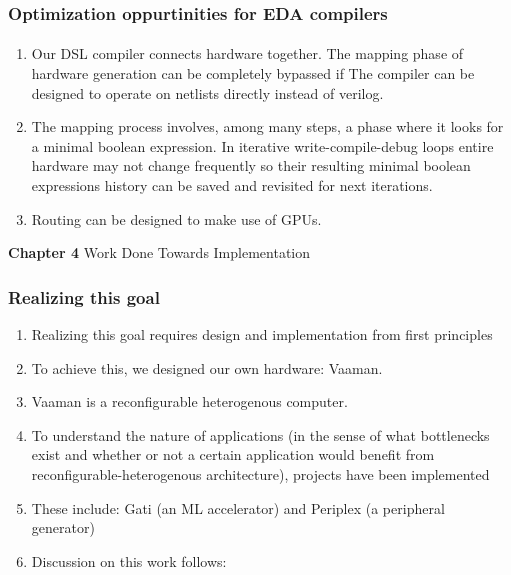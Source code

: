 \documentclass{beamer}
\begin{document}
{\begin{frame}[fragile]
  \frametitle{Optimization oppurtinities for EDA compilers}
  \framesubtitle{}
  \begin{enumerate}
    \item Our DSL compiler connects hardware together. The mapping phase
      of hardware generation can be completely bypassed if The compiler can
      be designed to operate on netlists directly instead of verilog.
    \item The mapping process involves, among many steps, a phase where it looks
      for a minimal boolean expression. In iterative write-compile-debug loops
      entire hardware may not change frequently so their resulting minimal
      boolean expressions history can be saved and revisited for next
      iterations.
    \item Routing can be designed to make use of GPUs.
  \end{enumerate}
\end{frame}

\begin{frame}[c,fragile]

  \centering
  \textbf{Chapter 4}
  Work Done Towards Implementation
\end{frame}

\begin{frame}[fragile]
  \frametitle{Realizing this goal}
  \begin{enumerate}
    \item Realizing this goal requires design and implementation from
      first principles
    \item To achieve this, we designed our own hardware: Vaaman. 
    \item Vaaman is a reconfigurable heterogenous computer.
    \item To understand the nature of applications (in the sense of what
      bottlenecks exist and whether or not a certain application would
      benefit from reconfigurable-heterogenous architecture), projects have been implemented
    \item These include: Gati (an ML accelerator) and Periplex (a peripheral
      generator)
    \item Discussion on this work follows:
  \end{enumerate}
  \framesubtitle{}
\end{frame}

}
\end{document}

